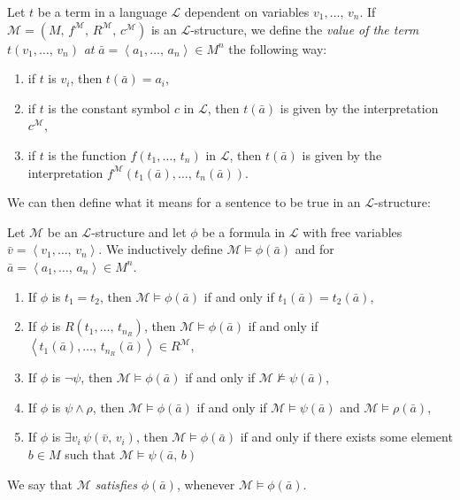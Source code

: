\documentclass[../../main.tex]{subfiles}
\begin{document}
\begin{definition}\cite[1.3.13]{Cha90}
    Let $t$ be a term in a language $\mathcal{L}$ dependent on variables $v_1,\ldots,\, v_n$.
    If $\mathcal{M} = \left(M,\, f^{\mathcal{M}},\, R^{\mathcal{M}},\, c^{\mathcal{M}}\right)$ is an $\mathcal{L}$-structure,
    we define the \textit{value of the term} $t(v_1,\ldots,\, v_n)$ \textit{at} $\bar{a} = \left<a_1,\ldots,\, a_n\right> \in M^n$ the following way:
    \begin{enumerate}
        \item if $t$ is $v_i$, then $t(\bar{a}) = a_i$,
        \item if $t$ is the constant symbol $c$ in $\mathcal{L}$, 
        then $t(\bar{a})$ is given by the interpretation $c^{\mathcal{M}}$,
        \item if $t$ is the function $f(t_1,\ldots,\, t_n)$ in $\mathcal{L}$,
        then $t(\bar{a})$ is given by the interpretation 
        $f^{\mathcal{M}}(t_1(\bar{a}),\ldots,\, t_n(\bar{a}))$.
    \end{enumerate}
\end{definition}

We can then define what it means for a sentence to be true in an $\mathcal{L}$-structure:
\begin{definition}\label{model-satisfaction-def}\cite[Definition 1.1.6]{Mar02}
    Let $\mathcal{M}$ be an $\mathcal{L}$-structure and let $\phi$ be a formula in $\mathcal{L}$ with free variables $\bar{v} = \left<v_1,\ldots,\, v_n\right>$.
    We inductively define $\mathcal{M} \models \phi(\bar{a})$ and for $\bar{a} = \left<a_1,\ldots,\, a_n\right> \in M^n$.

    \begin{enumerate}
        \item If $\phi$ is $t_1 = t_2$,
        then $\mathcal{M} \models \phi(\bar{a})$ if and only if $t_1(\bar{a}) = t_2(\bar{a})$, 
        \item If $\phi$ is $R\left(t_1,\ldots,\, t_{n_R}\right)$,
        then $\mathcal{M} \models \phi(\bar{a})$ if and only if $\left<t_1(\bar{a}),\ldots,\, t_{n_R}(\bar{a})\right> \in R^{\mathcal{M}}$,
        \item If $\phi$ is $\lnot \psi$, 
        then $\mathcal{M} \models \phi(\bar{a})$ if and only if $\mathcal{M} \not\models \psi(\bar{a})$,
        \item If $\phi$ is $\psi \wedge \rho$, 
        then $\mathcal{M} \models \phi(\bar{a})$ if and only if $\mathcal{M} \models \psi(\bar{a})$ and $\mathcal{M} \models \rho(\bar{a})$,
        \item If $\phi$ is $\exists v_i\, \psi(\bar{v},\, v_i)$,
        then $\mathcal{M} \models \phi(\bar{a})$ if and only if there exists some element $b \in M$ such that $\mathcal{M} \models \psi(\bar{a},\, b)$
    \end{enumerate}

    We say that $\mathcal{M}$ \textit{satisfies} $\phi(\bar{a})$, whenever $\mathcal{M} \models \phi(\bar{a})$.
\end{definition}
\end{document}
